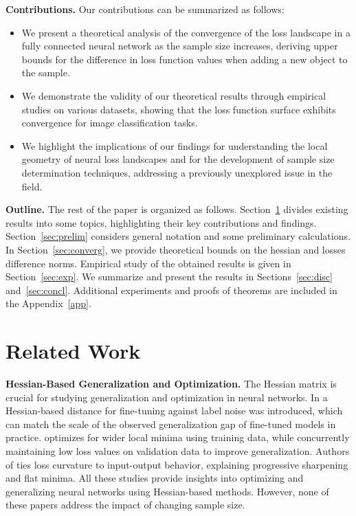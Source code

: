 \documentclass{article}
\begin{document}
\textbf{Contributions.} Our contributions can be summarized as follows:
\begin{itemize}
    \item We present a theoretical analysis of the convergence of the loss landscape in a fully connected neural network as the sample size increases, deriving upper bounds for the difference in loss function values when adding a new object to the sample.
    \item We demonstrate the validity of our theoretical results through empirical studies on various datasets, showing that the loss function surface exhibits convergence for image classification tasks.
    \item We highlight the implications of our findings for understanding the local geometry of neural loss landscapes and for the development of sample size determination techniques, addressing a previously unexplored issue in the field.
\end{itemize}

\textbf{Outline.} The rest of the paper is organized as follows. Section~\ref{sec:rw} divides existing results into some topics, highlighting their key contributions and findings. Section~\ref{sec:prelim} considers general notation and some preliminary calculations. In Section~\ref{sec:converg}, we provide theoretical bounds on the hessian and losses difference norms. Empirical study of the obtained results is given in Section~\ref{sec:exp}. We summarize and present the results in Sections~\ref{sec:disc} and~\ref{sec:concl}. Additional experiments and proofs of theorems are included in the Appendix~\ref{app}.

\section{Related Work}\label{sec:rw}

\textbf{Hessian-Based Generalization and Optimization.}
The Hessian matrix is crucial for studying generalization and optimization in neural networks. In \cite{ju2023robustfinetuningdeepneural} a Hessian-based distance for fine-tuning against label noise was introduced, which can match the scale of the observed generalization gap of fine-tuned models in practice. \cite{nguyen2024agnosticsharpnessawareminimization} optimizes for wider local minima using training data, while concurrently maintaining low loss values on validation data to improve generalization. Authors of \cite{macdonald2023progressivesharpeningflatminima} ties loss curvature to input-output behavior, explaining progressive sharpening and flat minima. All these studies provide insights into optimizing and generalizing neural networks using Hessian-based methods. However, none of these papers address the impact of changing sample size. 
\end{document}
